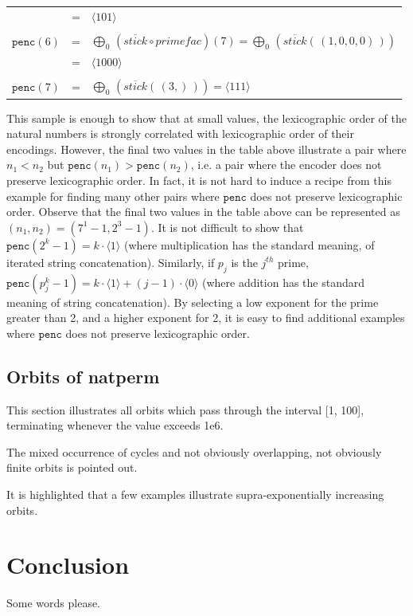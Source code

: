 \documentclass[12pt,reqno]{article}
\begin{document}
\begin{center}
\begin{tabular}{l c l}
                              & = & $\langle 101 \rangle$ \\
  \\
  $\texttt{penc}(6)$ & = & $\bigoplus_0 \, (\overline{stick} \circ primefac) (7) = \bigoplus_0 \, (\overline{stick} (\, (1, 0, 0, 0) \, )) $ \\
                              & = & $\langle 1000 \rangle$ \\
  \\
  $\texttt{penc}(7)$ & = & $\bigoplus_0 \, (\overline{stick} (\, (3,) \, )) = \langle 111 \rangle$ \\
\end{tabular} \end{center}

This sample is enough to show that at small values, the lexicographic order of the natural numbers is strongly correlated with lexicographic order of their encodings. However, the final two values in the table above illustrate a pair where $n_1 < n_2$ but $\texttt{penc}(n_1) > \texttt{penc}(n_2)$, i.e. a pair where the encoder does not preserve lexicographic order. In fact, it is not hard to induce a recipe from this example for finding many other pairs where $\texttt{penc}$ does not preserve lexicographic order. Observe that the final two values in the table above can be represented as $(n_1, n_2) = (7^1 - 1, 2^3 - 1)$. It is not difficult to show that $\texttt{penc}(2^k - 1) = k \cdot \langle 1 \rangle$ (where multiplication has the standard meaning, of iterated string concatenation). Similarly, if $p_j$ is the $j^{th}$ prime, $\texttt{penc}(p_j^k - 1) = k \cdot \langle 1 \rangle + (j - 1) \cdot \langle 0 \rangle$ (where addition has the standard meaning of string concatenation). By selecting a low exponent for the prime greater than 2, and a higher exponent for 2, it is easy to find additional examples where $\texttt{penc}$ does not preserve lexicographic order.

\subsection{Orbits of natperm}

This section illustrates all orbits which pass through the interval [1, 100], terminating whenever the value exceeds 1e6.

The mixed occurrence of cycles and not obviously overlapping, not obviously finite orbits is pointed out.

It is highlighted that a few examples illustrate supra-exponentially increasing orbits.

\section{Conclusion}

Some words please.
\end{document}
